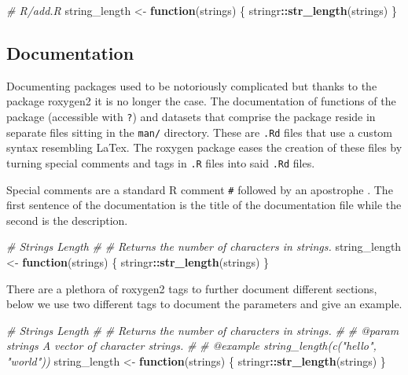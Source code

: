 \documentclass[
]{krantz}
\makeatletter
\newenvironment{Shaded}{\begin{snugshade}}{\end{snugshade}}
\newcommand{\CommentTok}[1]{\textcolor[rgb]{0.37,0.37,0.37}{\textit{#1}}}
\newcommand{\ControlFlowTok}[1]{\textcolor[rgb]{0.27,0.27,0.27}{\textbf{#1}}}
\newcommand{\KeywordTok}[1]{\textcolor[rgb]{0.27,0.27,0.27}{\textbf{#1}}}
\newcommand{\NormalTok}[1]{#1}
\newcommand{\OperatorTok}[1]{\textcolor[rgb]{0.43,0.43,0.43}{\textbf{#1}}}
\newcommand{\StringTok}[1]{\textcolor[rgb]{0.5,0.5,0.5}{#1}}
\newenvironment{kframe}{%
\medskip{}
\setlength{\fboxsep}{.8em}
 \def\at@end@of@kframe{}%
 \ifinner\ifhmode%
  \def\at@end@of@kframe{\end{minipage}}%
  \begin{minipage}{\columnwidth}%
 \fi\fi%
 \def\FrameCommand##1{\hskip\@totalleftmargin \hskip-\fboxsep
 \colorbox{shadecolor}{##1}\hskip-\fboxsep
     \hskip-\linewidth \hskip-\@totalleftmargin \hskip\columnwidth}%
 \MakeFramed {\advance\hsize-\width
   \@totalleftmargin\z@ \linewidth\hsize
   \@setminipage}}%
 {\par\unskip\endMakeFramed%
 \at@end@of@kframe}
\renewenvironment{Shaded}{\begin{kframe}}{\end{kframe}}
\makeatother
\begin{document}
\begin{Shaded}
\begin{Highlighting}[]
\CommentTok{\# R/add.R}
\NormalTok{string\_length <{-}}\StringTok{ }\ControlFlowTok{function}\NormalTok{(strings) \{}
\NormalTok{  stringr}\OperatorTok{::}\KeywordTok{str\_length}\NormalTok{(strings)}
\NormalTok{\}}
\end{Highlighting}
\end{Shaded}

\hypertarget{basics-documentation}{%
\subsection{Documentation}\label{basics-documentation}}

Documenting packages used to be notoriously complicated but thanks to the package roxygen2 it is no longer the case. The documentation of functions of the package (accessible with \texttt{?}) and datasets that comprise the package reside in separate files sitting in the \texttt{man/} directory. These are \texttt{.Rd} files that use a custom syntax resembling LaTex. The roxygen package eases the creation of these files by turning special comments and tags in \texttt{.R} files into said \texttt{.Rd} files.

Special comments are a standard R comment \texttt{\#} followed by an apostrophe \texttt{\textquotesingle{}}. The first sentence of the documentation is the title of the documentation file while the second is the description.

\begin{Shaded}
\begin{Highlighting}[]
\CommentTok{\#\textquotesingle{} Strings Length}
\CommentTok{\#\textquotesingle{} }
\CommentTok{\#\textquotesingle{} Returns the number of characters in strings. }
\NormalTok{string\_length <{-}}\StringTok{ }\ControlFlowTok{function}\NormalTok{(strings) \{}
\NormalTok{  stringr}\OperatorTok{::}\KeywordTok{str\_length}\NormalTok{(strings)}
\NormalTok{\}}
\end{Highlighting}
\end{Shaded}

There are a plethora of roxygen2 tags to further document different sections, below we use two different tags to document the parameters and give an example.

\begin{Shaded}
\begin{Highlighting}[]
\CommentTok{\#\textquotesingle{} Strings Length}
\CommentTok{\#\textquotesingle{} }
\CommentTok{\#\textquotesingle{} Returns the number of characters in strings. }
\CommentTok{\#\textquotesingle{} }
\CommentTok{\#\textquotesingle{} @param strings A vector of character strings.}
\CommentTok{\#\textquotesingle{} }
\CommentTok{\#\textquotesingle{} @example string\_length(c("hello", "world"))}
\NormalTok{string\_length <{-}}\StringTok{ }\ControlFlowTok{function}\NormalTok{(strings) \{}
\NormalTok{  stringr}\OperatorTok{::}\KeywordTok{str\_length}\NormalTok{(strings)}
\NormalTok{\}}
\end{Highlighting}
\end{Shaded}
\end{document}
